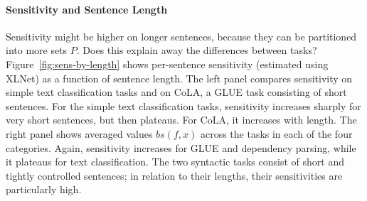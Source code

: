 \documentclass[11pt,a4paper]{article}
\begin{document}
\paragraph{Sensitivity and Sentence Length}
Sensitivity might be higher on longer sentences, because they can be partitioned into more sets $P$.
Does this explain away the differences between tasks?
Figure~\ref{fig:sens-by-length} shows per-sentence sensitivity (estimated using XLNet) as a function of sentence length.
The left panel compares sensitivity on simple text classification tasks and on CoLA, a GLUE task consisting of short sentences.
For the simple text classification tasks, sensitivity increases sharply for very short sentences, but then plateaus.
For CoLA, it increases with length.
The right panel shows averaged values $bs(f,x)$ across the tasks in each of the four categories.
Again, sensitivity increases for GLUE and dependency parsing, while it plateaus for text classification.
The two syntactic tasks consist of short and tightly controlled sentences; in relation to their lengths, their sensitivities are particularly high. %
\end{document}

